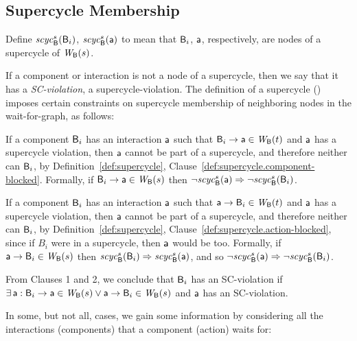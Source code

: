 

\subsection{Supercycle Membership} 


\label{defn:supercycle.membership}
Define $\mathit{scyc}_{\mathsf{B}}^{s}({\mathsf{B}_i})$, $\mathit{scyc}_{\mathsf{B}}^{s}({\mathsf{a}})$ to mean that $\mathsf{B}_i$,
$\mathsf{a}$, respectively, are nodes of a supercycle of $\mathit{W}_{\mathsf{B}}({s})$.
\ed

If a component or interaction is not a node of a supercycle, then we say that it has a
\emph{SC-violation}, \ie a supercycle-violation.
%
The definition of a supercycle ()
imposes certain constraints on supercycle membership of neighboring
nodes in the wait-for-graph, as follows:

\bn

\item If a component $\mathsf{B}_i$ has an interaction $\mathsf{a}$ such that $\mathsf{B}_i \rightarrow \mathsf{a} \in \mathit{W}_{\mathsf{B}}({t})$ and
  $\mathsf{a}$ has a supercycle violation, then $\mathsf{a}$ cannot be part of a supercycle, and therefore
  neither can $\mathsf{B}_i$, by Definition~\ref{def:supercycle},
  Clause~\ref{def:supercycle.component-blocked}.  Formally, if $\mathsf{B}_i \rightarrow \mathsf{a} \in \mathit{W}_{\mathsf{B}}({s})$ then
  $\neg \mathit{scyc}_{\mathsf{B}}^{s}({\mathsf{a}}) \Rightarrow \neg \mathit{scyc}_{\mathsf{B}}^{s}({\mathsf{B}_i})$.

\item If a component $\mathsf{B}_i$ has an interaction $\mathsf{a}$ such that $\mathsf{a} \rightarrow \mathsf{B}_i \in \mathit{W}_{\mathsf{B}}({t})$ and
  $\mathsf{a}$ has a supercycle violation, then $\mathsf{a}$ cannot be part of a supercycle, and therefore
  neither can $\mathsf{B}_i$, by Definition~\ref{def:supercycle},
  Clause~\ref{def:supercycle.action-blocked}, since if $B_i$ were in a supercycle, then $\mathsf{a}$ would
  be too.
Formally, if $\mathsf{a} \rightarrow \mathsf{B}_i \in \mathit{W}_{\mathsf{B}}({s})$ then $\mathit{scyc}_{\mathsf{B}}^{s}({\mathsf{B}_i}) \Rightarrow \mathit{scyc}_{\mathsf{B}}^{s}({\mathsf{a}})$, and so $\neg \mathit{scyc}_{\mathsf{B}}^{s}({\mathsf{a}}) \Rightarrow \neg \mathit{scyc}_{\mathsf{B}}^{s}({\mathsf{B}_i})$.

\en

From Clauses 1 and 2, we conclude that $\mathsf{B}_i$ has an SC-violation if 
$\exists\, \mathsf{a}: \mathsf{B}_i \rightarrow \mathsf{a} \in \mathit{W}_{\mathsf{B}}({s}) \lor \mathsf{a} \rightarrow \mathsf{B}_i \in \mathit{W}_{\mathsf{B}}({s})$ and $\mathsf{a}$ has an SC-violation.

In some, but not all, cases, we gain some information by considering all the interactions (components) that a component
(action) waits for:

\bn

